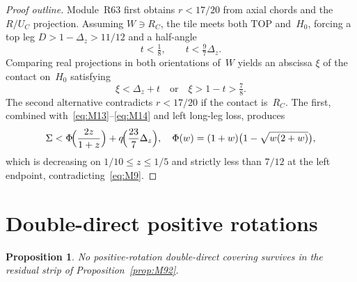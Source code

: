 \documentclass[11pt,reqno]{amsart}
\newtheorem{proposition}[theorem]{Proposition}
\theoremstyle{definition}
\newcommand{\TOP}{\mathrm{TOP}}
\begin{document}
\begin{proof}[Proof outline]
Module~R63 first obtains $r<17/20$ from axial chords and the $R/U_C$
projection.  Assuming $W\ni R_C$, the tile meets both $\TOP$ and~$H_0$, forcing a
top leg $D>1-\Delta_z>11/12$ and a half-angle
\begin{equation}\label{eq:M14}
t<\tfrac18,\qquad t<\tfrac97\Delta_z.
\end{equation}
Comparing real projections in both orientations of~$W$ yields an abscissa
$\xi$ of the contact on~$H_0$ satisfying
\begin{equation}\label{eq:M15}
\xi<\Delta_z+t
\quad\text{or}\quad
\xi>1-t>\tfrac78.
\end{equation}
The second alternative contradicts $r<17/20$ if the contact is~$R_C$.  The first,
combined with~\eqref{eq:M13}--\eqref{eq:M14} and left long-leg loss, produces
\begin{equation}
\Sigma<\Phi\!\Bigl(\frac{2z}{1+z}\Bigr)+q\!\Bigl(\frac{23}{7}\Delta_z\Bigr),
\quad
\Phi(w)=(1+w)\bigl(1-\sqrt{w(2+w)}\bigr),
\end{equation}
which is decreasing on $1/10\le z\le 1/5$ and strictly less than $7/12$ at the
left endpoint, contradicting~\eqref{eq:M9}.
\end{proof}

\section{Double-direct positive rotations}\label{sec:finale}

\begin{proposition}\label{prop:M111}
No positive-rotation double-direct covering survives in the residual strip of
Proposition~\ref{prop:M92}.
\end{proposition}
\end{document}
